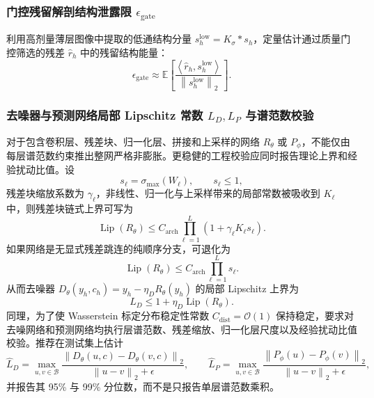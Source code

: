 \documentclass[11pt,a4paper,UTF8,fontset=fandol]{ctexart}
\theoremstyle{definition}
\DeclareMathOperator{\Lip}{Lip}
\newcommand{\norm}[1]{\left\lVert#1\right\rVert}
\newcommand{\ip}[2]{\left\langle#1,#2\right\rangle}
\newcommand{\E}{\mathbb{E}}
\begin{document}
\subsubsection{门控残留解剖结构泄露限 \texorpdfstring{$\epsilon_{\mathrm{gate}}$}{epsilon-gate}}
利用高剂量薄层图像中提取的低通结构分量 $s_h^{\mathrm{low}} = K_\sigma * s_h$，定量估计通过质量门控筛选的残差 $\hat r_h$ 中的残留结构能量：
\begin{equation}
    \epsilon_{\mathrm{gate}} \approx \E \left[ \frac{\ip{\hat r_h}{s_h^{\mathrm{low}}}}{\norm{s_h^{\mathrm{low}}}_2} \right].
\end{equation}

\subsubsection{去噪器与预测网络局部 Lipschitz 常数 \texorpdfstring{$L_D,L_P$}{LD-LP} 与谱范数校验}
对于包含卷积层、残差块、归一化层、拼接和上采样的网络 $R_\theta$ 或 $P_\phi$，不能仅由每层谱范数约束推出整网严格非膨胀。更稳健的工程校验应同时报告理论上界和经验扰动比值。设
\begin{equation}
    s_\ell=\sigma_{\max}(W_\ell), \qquad s_\ell\le 1,
\end{equation}
残差块缩放系数为 $\gamma_\ell$，非线性、归一化与上采样带来的局部常数被吸收到 $K_\ell$ 中，则残差块链式上界可写为
\begin{equation}
    \Lip(R_\theta)
    \le
    C_{\mathrm{arch}}\prod_{\ell=1}^{L}(1+\gamma_\ell K_\ell s_\ell).
\end{equation}
如果网络是无显式残差跳连的纯顺序分支，可退化为
\begin{equation}
    \Lip(R_\theta)
    \le C_{\mathrm{arch}}\prod_{\ell=1}^{L}s_\ell.
\end{equation}
从而去噪器 $D_\theta(y_h,c_h)=y_h-\eta_D R_\theta(y_h)$ 的局部 Lipschitz 上界为
\begin{equation}
    L_D\le1+\eta_D\Lip(R_\theta).
\end{equation}
同理，为了使 Wasserstein 标定分布稳定性常数 $C_{\mathrm{dist}}=\mathcal O(1)$ 保持稳定，要求对去噪网络和预测网络均执行层谱范数、残差缩放、归一化层尺度以及经验扰动比值校验。推荐在测试集上估计
\begin{equation}
    \widehat L_D=
    \max_{u,v\in\mathcal B}
    \frac{\norm{D_\theta(u,c)-D_\theta(v,c)}_2}{\norm{u-v}_2+\epsilon},
    \qquad
    \widehat L_P=
    \max_{u,v\in\mathcal B}
    \frac{\norm{P_\phi(u)-P_\phi(v)}_2}{\norm{u-v}_2+\epsilon},
\end{equation}
并报告其 95\% 与 99\% 分位数，而不是只报告单层谱范数乘积。
\end{document}
